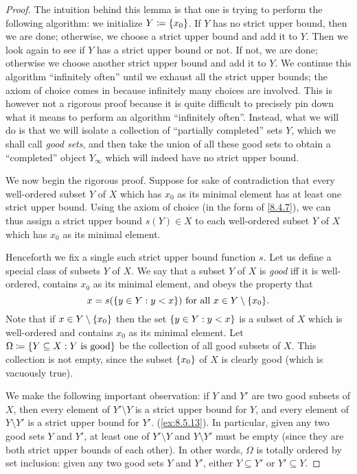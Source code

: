 \begin{proof}
  The intuition behind this lemma is that one is trying to perform the following algorithm:
  we initialize \(Y \coloneqq \left\lbrace x_0\right\rbrace\).
  If \(Y\) has no strict upper bound, then we are done;
  otherwise, we choose a strict upper bound and add it to \(Y\).
  Then we look again to see if \(Y\) has a strict upper bound or not.
  If not, we are done;
  otherwise we choose another strict upper bound and add it to \(Y\).
  We continue this algorithm ``infinitely often'' until we exhaust all the strict upper bounds;
  the axiom of choice comes in because infinitely many choices are involved.
  This is however not a rigorous proof because it is quite difficult to precisely pin down what it means to perform an algorithm ``infinitely often''.
  Instead, what we will do is that we will isolate a collection of ``partially completed'' sets \(Y\), which we shall call \emph{good sets}, and then take the union of all these good sets to obtain a ``completed'' object \(Y_{\infty}\) which will indeed have no strict upper bound.

  We now begin the rigorous proof.
  Suppose for sake of contradiction that every well-ordered subset \(Y\) of \(X\) which has \(x_0\) as its minimal element has at least one strict upper bound.
  Using the axiom of choice (in the form of \cref{8.4.7}), we can thus assign a strict upper bound \(s(Y) \in X\) to each well-ordered subset \(Y\) of \(X\) which has \(x_0\) as its minimal element.

  Henceforth we fix a single such strict upper bound function \(s\).
  Let us define a special class of subsets \(Y\) of \(X\).
  We say that a subset \(Y\) of \(X\) is \emph{good} iff it is well-ordered, contains \(x_0\) as its minimal element, and obeys the property that
  \[
    x = s(\set{y \in Y : y < x}) \text{ for all } x \in Y \setminus \set{x_0}.
  \]
  Note that if \(x \in Y \setminus \left\lbrace x_0\right\rbrace\) then the set \(\left\lbrace y \in Y : y < x\right\rbrace\) is a subset of \(X\) which is well-ordered and contains \(x_0\) as its minimal element.
  Let \(\Omega \coloneqq \left\lbrace Y \subseteq X : Y \text{ is good}\right\rbrace\) be the collection of all good subsets of \(X\).
  This collection is not empty, since the subset \(\left\lbrace x_0\right\rbrace\) of \(X\) is clearly good
  (which is vacuously true).

  We make the following important observation:
  if \(Y\) and \(Y'\) are two good subsets of \(X\), then every element of \(Y' \setminus Y\) is a strict upper bound for \(Y\), and every element of \(Y \setminus Y'\) is a strict upper bound for \(Y'\).
  (\cref{ex:8.5.13}).
  In particular, given any two good sets \(Y\) and \(Y'\), at least one of \(Y' \setminus Y\) and \(Y \setminus Y'\) must be empty
  (since they are both strict upper bounds of each other).
  In other words, \(\Omega\) is totally ordered by set inclusion:
  given any two good sets \(Y\) and \(Y'\), either \(Y \subseteq Y'\) or \(Y' \subseteq Y\).


\end{proof}
